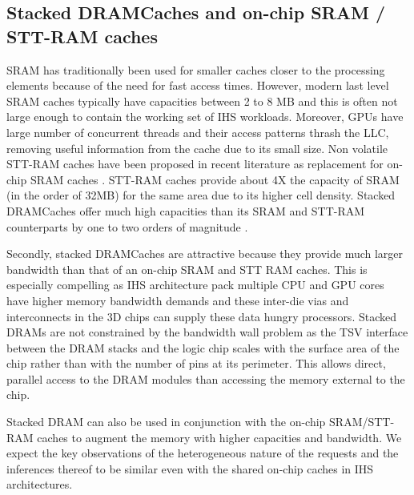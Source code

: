 \subsection{Stacked DRAMCaches and on-chip SRAM / STT-RAM caches}
SRAM has traditionally been used for smaller caches closer to the processing elements because of the need for fast access times.
However, modern last level SRAM caches typically have capacities between 2 to 8 MB \cite{skylake} and this is often not large enough to contain the working set of IHS workloads.
Moreover, GPUs have large number of concurrent threads and their access patterns thrash the LLC, removing useful information from the cache due to its small size. 
Non volatile STT-RAM caches have been proposed in recent literature as replacement for on-chip SRAM caches \cite{oscar}. STT-RAM caches provide about 4X the capacity of SRAM \cite{oscar} (in the order of 32MB) for the same area due to its higher cell density.
Stacked DRAMCaches offer much high capacities than its SRAM and STT-RAM counterparts by one to two orders of magnitude \cite{3d-stacked}.
\par Secondly, stacked DRAMCaches are attractive because they provide much larger bandwidth than that of an on-chip SRAM and STT RAM caches.
This is especially compelling as IHS architecture pack multiple CPU and GPU cores have higher memory bandwidth demands and these inter-die vias and interconnects in the 3D chips can supply these data hungry processors.
Stacked DRAMs are not constrained by the bandwidth wall problem as the TSV interface between the DRAM stacks and the logic chip scales with the surface area of the chip rather than with the number of pins at its perimeter. This allows direct, parallel access to the DRAM modules than accessing the memory external to the chip.
\par Stacked DRAM can also be used in conjunction with the on-chip SRAM/STT-RAM caches to augment the memory with higher capacities and bandwidth. We expect the key observations of the heterogeneous nature of the requests and the inferences thereof to be similar even with the shared on-chip caches in IHS architectures.


